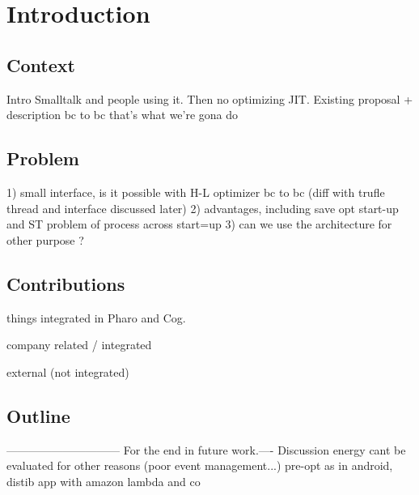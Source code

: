 \documentclass[a4paper,12pt,twoside]{../includes/ThesisStyle}
\begin{document}
\fi

\chapter{Introduction}
\label{chap:intro}
\minitoc

\section{Context}

Intro Smalltalk and people using it.
Then no optimizing JIT.
Existing proposal + description bc to bc
that's what we're gona do

\section{Problem}

1) small interface, is it possible with  H-L optimizer bc to bc (diff with trufle thread and interface discussed later)
2) advantages, including save opt start-up and ST problem of process across start=up
3) can we use the architecture for other purpose ?

\section{Contributions}

things integrated in Pharo and Cog.

company related / integrated

external (not integrated)

\section{Outline}


------------------------------
For the end in future work.----
Discussion energy cant be evaluated for other reasons (poor event management...) pre-opt as in android, distib app with amazon lambda and co

\ifx\wholebook\relax\else
    
\end{document}
